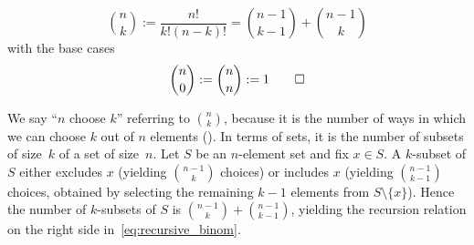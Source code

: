 



\begin{definition}\label{def:binomial-coefficient}
\begin{equation}\label{eq:recursive_binom}
\binom{n}{k} := \frac{n!}{k!(n-k)!} = \binom{n-1}{k-1} + \binom{n-1}{k}
\end{equation}
with the base cases
\begin{equation}\label{eq:base_cases_binom}
  \binom{n}{0} := \binom{n}{n} := 1 \qedhere
\end{equation}
\end{definition}
We say ``$n$ choose $k$'' referring to $\binom{n}{k}$, because it is the number of ways in which we can choose $k$ out of $n$ elements ().
In terms of sets, it is the number of subsets of size~$k$ of a set of size~$n$.
Let \(S\) be an \(n\)-element set and fix \(x\in S\). 
A \(k\)-subset of \(S\) either excludes \(x\) (yielding \(\binom{n-1}{k}\) choices) or includes \(x\) (yielding \(\binom{n-1}{k-1}\) choices, 
obtained by selecting the remaining \(k-1\) elements from \(S\setminus\{x\}\)). 
Hence the number of \(k\)-subsets of \(S\) is \(\binom{n-1}{k} + \binom{n-1}{k-1}\), yielding the recursion relation on the right side in~\eqref{eq:recursive_binom}.

